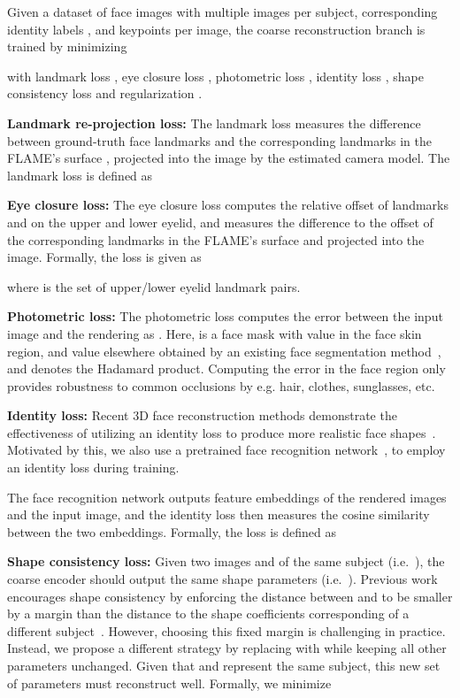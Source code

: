 \documentclass[final]{cvpr}
\newcommand{\qheading}[1]{\noindent\textbf{#1}}
\begin{document}
Given a dataset of  face images  with multiple images per subject, corresponding identity labels , and   keypoints  per image, the coarse reconstruction branch is trained by minimizing

with landmark loss , eye closure loss , photometric loss , identity loss , shape consistency loss  and regularization .

\qheading{Landmark re-projection loss:}
The landmark loss measures the difference between ground-truth  face landmarks  and the corresponding landmarks in the FLAME's surface , projected into the image by the estimated camera model. 
The landmark loss is defined as


\qheading{Eye closure loss:}
The eye closure loss computes the relative offset of landmarks  and  on the upper and lower eyelid, and measures the difference to the offset of the corresponding landmarks in the FLAME's surface  and  projected into the image.
Formally, the loss is given as

where  is the set of upper/lower eyelid landmark pairs.

\qheading{Photometric loss:}
The photometric loss computes the error between the input image  and the rendering  as .
Here,  is a face mask with value  in the face skin region, and value  elsewhere obtained by an existing face segmentation method~\cite{Nirkin2018}, and  denotes the Hadamard product.
Computing the error in the face region only provides robustness to common occlusions by e.g. hair, clothes, sunglasses, etc.

\qheading{Identity loss:}
Recent 3D face reconstruction methods demonstrate the effectiveness of utilizing an identity loss to produce more realistic face shapes~\cite{Deng2019,Gecer2019}. 
Motivated by this, we also use a pretrained face recognition network~\cite{Cao2018_VGGFace2}, to employ an identity loss during training. 

The face recognition network  outputs feature embeddings of the rendered images and the input image, and the identity loss then measures the cosine similarity between the two embeddings.
Formally, the loss is defined as


\qheading{Shape consistency loss:}
Given two images  and  of the same subject (i.e.~), the coarse encoder  should output the same shape parameters (i.e.~).
Previous work encourages shape consistency by enforcing the distance between  and  to be smaller by a margin than the distance to the shape coefficients corresponding of a different subject~\cite{Sanyal2019}. 
However, choosing this fixed margin is challenging in practice. 
Instead, we propose a different strategy by replacing  with  while keeping all other parameters unchanged.
Given that  and  represent the same subject, this new set of parameters must reconstruct  well. 
Formally, we minimize
\end{document}

